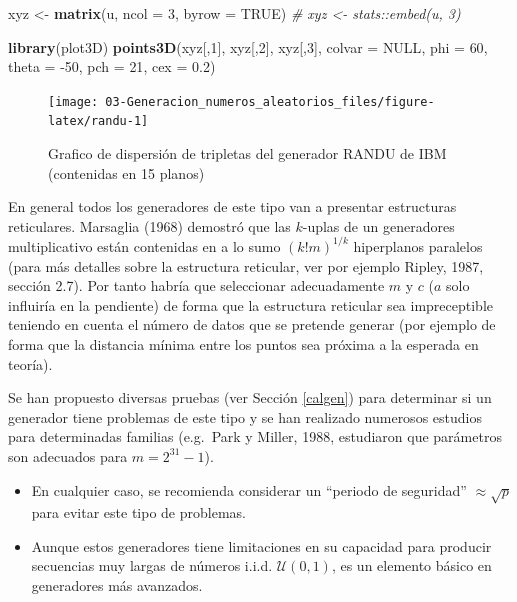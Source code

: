 \documentclass[
]{book}
\newenvironment{Shaded}{\begin{snugshade}}{\end{snugshade}}
\newcommand{\CommentTok}[1]{\textcolor[rgb]{0.56,0.35,0.01}{\textit{#1}}}
\newcommand{\DataTypeTok}[1]{\textcolor[rgb]{0.13,0.29,0.53}{#1}}
\newcommand{\DecValTok}[1]{\textcolor[rgb]{0.00,0.00,0.81}{#1}}
\newcommand{\FloatTok}[1]{\textcolor[rgb]{0.00,0.00,0.81}{#1}}
\newcommand{\KeywordTok}[1]{\textcolor[rgb]{0.13,0.29,0.53}{\textbf{#1}}}
\newcommand{\NormalTok}[1]{#1}
\newcommand{\OtherTok}[1]{\textcolor[rgb]{0.56,0.35,0.01}{#1}}
\newcommand{\StringTok}[1]{\textcolor[rgb]{0.31,0.60,0.02}{#1}}
\theoremstyle{break}
\theoremstyle{definition}
\theoremstyle{definition}
\theoremstyle{definition}
\theoremstyle{remark}
\begin{document}
\begin{Shaded}
\begin{Highlighting}[]
\NormalTok{xyz <-}\StringTok{ }\KeywordTok{matrix}\NormalTok{(u, }\DataTypeTok{ncol =} \DecValTok{3}\NormalTok{, }\DataTypeTok{byrow =} \OtherTok{TRUE}\NormalTok{)}
\CommentTok{# xyz <- stats::embed(u, 3)}

\KeywordTok{library}\NormalTok{(plot3D)}
\KeywordTok{points3D}\NormalTok{(xyz[,}\DecValTok{1}\NormalTok{], xyz[,}\DecValTok{2}\NormalTok{], xyz[,}\DecValTok{3}\NormalTok{], }\DataTypeTok{colvar =} \OtherTok{NULL}\NormalTok{, }\DataTypeTok{phi =} \DecValTok{60}\NormalTok{, }
         \DataTypeTok{theta =} \DecValTok{-50}\NormalTok{, }\DataTypeTok{pch =} \DecValTok{21}\NormalTok{, }\DataTypeTok{cex =} \FloatTok{0.2}\NormalTok{)}
\end{Highlighting}
\end{Shaded}

\begin{figure}[!htb]

{\centering \texttt{[image: 03-Generacion\_numeros\_aleatorios\_files/figure-latex/randu-1]} 

}

\caption{Grafico de dispersión de tripletas del generador RANDU de IBM (contenidas en 15 planos)}\label{fig:randu}
\end{figure}

En general todos los generadores de este tipo van a presentar estructuras reticulares.
Marsaglia (1968) demostró que las \(k\)-uplas de un generadores multiplicativo están contenidas en a lo sumo \(\left(k!m\right)^{1/k}\) hiperplanos paralelos (para más detalles sobre la estructura reticular, ver por ejemplo Ripley, 1987, sección 2.7).
Por tanto habría que seleccionar adecuadamente \(m\) y \(c\) (\(a\) solo influiría en la pendiente) de forma que la estructura reticular sea impreceptible teniendo en cuenta el número de datos que se pretende generar (por ejemplo de forma que la distancia mínima entre los puntos sea próxima a la esperada en teoría).

Se han propuesto diversas pruebas (ver Sección \ref{calgen}) para
determinar si un generador tiene problemas de este tipo y se han
realizado numerosos estudios para determinadas familias (e.g.~Park y
Miller, 1988, estudiaron que parámetros son adecuados para \(m=2^{31}-1\)).

\begin{itemize}
\item
  En cualquier caso, se recomienda considerar un ``periodo de
  seguridad'' \(\approx \sqrt{p}\) para evitar este tipo de problemas.
\item
  Aunque estos generadores tiene limitaciones en su capacidad para
  producir secuencias muy largas de números i.i.d. \(\mathcal{U}(0,1)\),
  es un elemento básico en generadores más avanzados.
\end{itemize}
\end{document}
